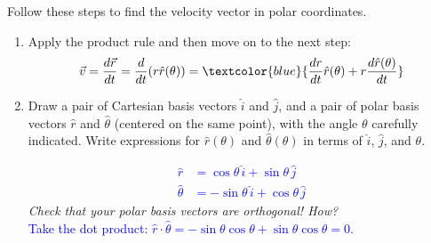 \documentclass[11pt, letterpaper, openany]{book}
\newenvironment{exercise}[1][Exercise]{%
  \tcolorbox[blanker, breakable, left=1em,
    before skip=1em, after skip=1em,
    borderline west={3pt}{0pt}{PhysNavy},
    colback=PhysCream,
    before upper={\textcolor{PhysNavy}{\sffamily\bfseries #1:}\space}
  ]%
}{%
  \endtcolorbox%
}
\begin{document}
\begin{exercise}[Exercise 3]
Follow these steps to find the velocity vector in polar coordinates.
\begin{enumerate}[label=(\alph*)]
    \item Apply the product rule and then move on to the next step:
    \[ \vec{v} = \frac{d\vec{r}}{dt} = \frac{d}{dt}(r\hat{r}(\theta)) = \textcolor{blue}{\frac{dr}{dt}\hat{r}(\theta) + r\frac{d\hat{r}(\theta)}{dt}} \]
    \item Draw a pair of Cartesian basis vectors $\hat{i}$ and $\hat{j}$, and a pair of polar basis vectors $\hat{r}$ and $\hat{\theta}$ (centered on the same point), with the angle $\theta$ carefully indicated. Write expressions for $\hat{r}(\theta)$ and $\hat{\theta}(\theta)$ in terms of $\hat{i}$, $\hat{j}$, and $\theta$.
    
    \textcolor{blue}{
    \begin{align*}
        \hat{r} &= \cos\theta\,\hat{i} + \sin\theta\,\hat{j} \\
        \hat{\theta} &= -\sin\theta\,\hat{i} + \cos\theta\,\hat{j}
    \end{align*}
    }
    \textit{Check that your polar basis vectors are orthogonal! How?} \\
    \textcolor{blue}{Take the dot product: $\hat{r} \cdot \hat{\theta} = -\sin\theta\cos\theta + \sin\theta\cos\theta = 0$.}
    

\end{enumerate}
\end{exercise}
\end{document}
